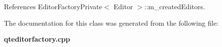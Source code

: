 References Editor\+Factory\+Private$<$ Editor $>$\+::m\+\_\+created\+Editors.



The documentation for this class was generated from the following file\+:\begin{DoxyCompactItemize}
\item 
{\bf qteditorfactory.\+cpp}\end{DoxyCompactItemize}
